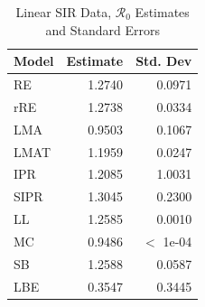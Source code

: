 \documentclass[12pt]{article}
\newcommand{\rr}{\ensuremath{\mathcal{R}_0}}
\begin{document}
\begin{table}[H]
	
	\centering
	\begin{tabular}[t]{l|r|r}
		\hline
		Model & Estimate & Std. Dev\\
		\hline
		RE & 1.2740 & 0.0971\\
		\hline
		rRE & 1.2738 & 0.0334\\
		\hline
		LMA & 0.9503 & 0.1067\\
		\hline
		LMAT & 1.1959 & 0.0247\\
		\hline
		IPR & 1.2085 & 1.0031\\
		\hline
		SIPR & 1.3045 & 0.2300\\
		\hline
		LL & 1.2585 & 0.0010\\
		\hline
		MC & 0.9486 & $<$ 1e-04\\
		\hline
		SB & 1.2588 & 0.0587\\
		\hline
		LBE & 0.3547 & 0.3445\\
		\hline
	\end{tabular}
	\caption{Linear SIR Data, $\rr$ Estimates and Standard Errors}
\end{table}
\end{document}
